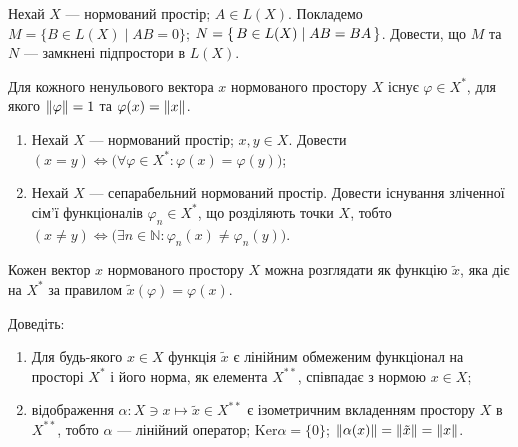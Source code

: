 \begin{exercise}
    Нехай $X$ --- нормований простір; $A \in L(X)$. Покладемо $M = \{B \in L(X) \;|\; AB=0\}$;
    $N = \set{B \in L(X) \mid AB=BA}$. Довести, що $M$ та $N$ --- замкнені підпростори в $L(X)$.
\end{exercise}

\begin{theory}
    \begin{theorem*}
        Для кожного ненульового вектора $x$ нормованого простору $X$ існує $\varphi \in X^*$,
        для якого $\left\lVert\varphi\right\rVert = 1$ та $\varphi(x) = \left\lVert x\right\rVert$. 
    \end{theorem*}
\end{theory}

\begin{exercise} 
    \begin{enumerate}[label=\ukr*)]
        \item Нехай $X$ --- нормований простір; $x,y \in X$. Довести $(x=y) \Leftrightarrow 
        \big(\forall\varphi \in X^*: \varphi(x) = \varphi(y)\big)$;
        \item Нехай $X$ --- сепарабельний нормований простір. Довести існування зліченної сім'ї
        функціоналів $\varphi_n \in X^*$, що розділяють точки $X$, тобто 
        $(x\neq y) \Leftrightarrow \big(\exists n \in \mathbb{N}: \varphi_n(x) \neq \varphi_n(y)\big)$.
    \end{enumerate}
\end{exercise}

\begin{theory}
    Кожен вектор $x$ нормованого простору $X$ можна розглядати як функцію $\tilde{x}$, яка 
    діє на $X^*$ за правилом $\tilde{x}(\varphi)=\varphi(x)$.
\end{theory}

\begin{exercise}
    Доведіть:~
    \begin{enumerate}[label=\ukr*)]
        \item Для будь-якого $x \in X$ функція $\tilde{x}$ є лінійним обмеженим функціонал на просторі $X^*$
        і його норма, як елемента $X^{**}$, співпадає з нормою $x \in X$;
        \item відображення $\alpha: X \ni x \mapsto \tilde{x} \in X^{**}$ є ізометричним вкладенням
        простору $X$ в $X^{**}$, тобто $\alpha$ --- лінійний оператор; $\mathrm{Ker}\alpha = \{0\}$; 
        $\left\lVert\alpha(x)\right\rVert = \left\lVert\tilde{x}\right\rVert = \left\lVert x\right\rVert$.
    \end{enumerate}
\end{exercise}

